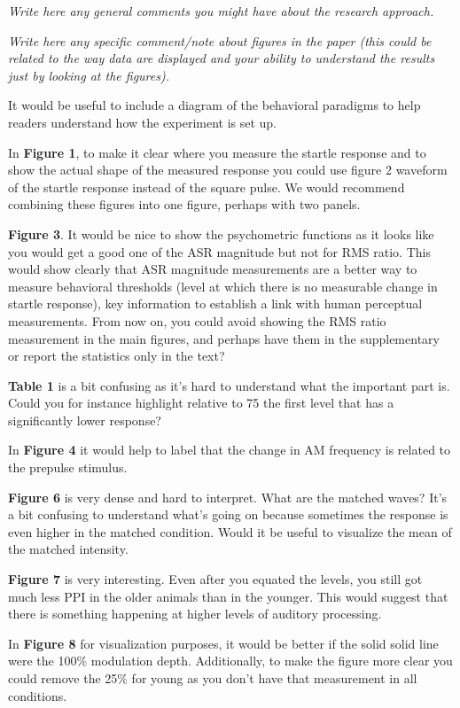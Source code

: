 \documentclass[10pt]{article}
\begin{document}
\emph{Write here any general comments you might have about the research
approach.}

\emph{Write here any specific comment/note about figures in the paper
(this could be related to the way data are displayed and your ability to
understand the results just by looking at the figures).}

It would be useful to include a diagram of the behavioral paradigms to
help readers understand how the experiment is set up.~

In \textbf{Figure 1}, to make it clear where you measure the startle
response and to show the actual shape of the measured response you could
use figure 2 waveform of the startle response instead of the square
pulse. We would recommend combining these figures into one figure,
perhaps with two panels.

\textbf{Figure 3}. It would be nice to show the psychometric functions
as it looks like you would get a good one of the ASR magnitude but not
for RMS ratio. This would show clearly that ASR magnitude measurements
are a better way to measure behavioral thresholds (level at which there
is no measurable change in startle response), key information to
establish a link with human perceptual measurements. From now on, you
could avoid showing the RMS ratio measurement in the main figures, and
perhaps have them in the supplementary or report the statistics only in
the text?

\textbf{Table 1} is a bit confusing as it's hard to understand what the
important part is. Could you for instance highlight relative to 75 the
first level that has a significantly lower response?

In \textbf{Figure 4} it would help to label that the change in AM
frequency is related to the prepulse stimulus.

\textbf{Figure 6} is very dense and hard to interpret. What are the
matched waves? It's a bit confusing to understand what's going on
because sometimes the response is even higher in the matched condition.
Would it be useful to visualize the mean of the matched intensity.

\textbf{Figure 7} is very interesting. Even after you equated the
levels, you still got much less PPI in the older animals than in the
younger. This would suggest that there is something happening at higher
levels of auditory processing.

In \textbf{Figure 8} for visualization purposes, it would be better if
the solid solid line were the 100\% modulation depth. Additionally, to
make the figure more clear you could remove the 25\% for young as you
don't have that measurement in all conditions.~
\end{document}
